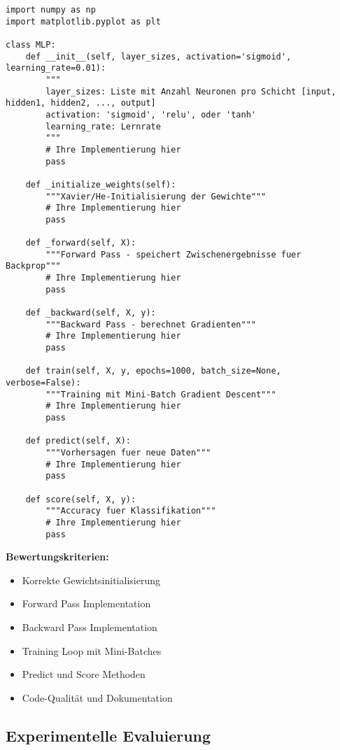 ﻿\documentclass[12pt,a4paper]{article}
\begin{document}
\begin{lstlisting}
import numpy as np
import matplotlib.pyplot as plt

class MLP:
    def __init__(self, layer_sizes, activation='sigmoid', learning_rate=0.01):
        """
        layer_sizes: Liste mit Anzahl Neuronen pro Schicht [input, hidden1, hidden2, ..., output]
        activation: 'sigmoid', 'relu', oder 'tanh'
        learning_rate: Lernrate
        """
        # Ihre Implementierung hier
        pass
    
    def _initialize_weights(self):
        """Xavier/He-Initialisierung der Gewichte"""
        # Ihre Implementierung hier
        pass
    
    def _forward(self, X):
        """Forward Pass - speichert Zwischenergebnisse fuer Backprop"""
        # Ihre Implementierung hier
        pass
    
    def _backward(self, X, y):
        """Backward Pass - berechnet Gradienten"""
        # Ihre Implementierung hier
        pass
    
    def train(self, X, y, epochs=1000, batch_size=None, verbose=False):
        """Training mit Mini-Batch Gradient Descent"""
        # Ihre Implementierung hier
        pass
    
    def predict(self, X):
        """Vorhersagen fuer neue Daten"""
        # Ihre Implementierung hier
        pass
    
    def score(self, X, y):
        """Accuracy fuer Klassifikation"""
        # Ihre Implementierung hier
        pass
\end{lstlisting}

\textbf{Bewertungskriterien:}
\begin{itemize}
    \item Korrekte Gewichtsinitialisierung 
    \item Forward Pass Implementation 
    \item Backward Pass Implementation 
    \item Training Loop mit Mini-Batches 
    \item Predict und Score Methoden 
    \item Code-Qualität und Dokumentation 
\end{itemize}

\subsection{Experimentelle Evaluierung }
\end{document}
